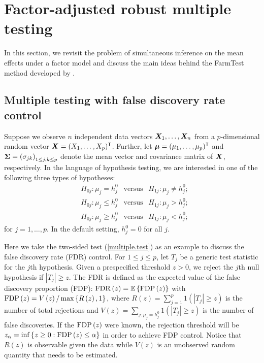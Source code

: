 \section[Factor-adjusted robust multiple testing]{Factor-adjusted robust multiple testing}\label{sec:methods}
In this section, we revisit the problem of simultaneous inference on the mean effects under a factor model and discuss the main ideas behind the FarmTest method developed by \cite{FKSZ2017}.


\subsection{Multiple testing with false discovery rate control}





Suppose we observe $n$ independent data vectors $\bm{X}_{1}, \ldots, \bm{X}_n$ from a $p$-dimensional random vector $\bm{X}= \left( X_1, \ldots, X_p \right)^\intercal$. Further, let $\bm{\mu} = \left( \mu_1, \ldots, \mu_p \right)^\intercal$ and $\bm{\Sigma} = \left(\sigma_{jk} \right)_{1\leq   j, k\leq  p}$ denote the mean vector and covariance matrix of $\bm{X}$, respectively. In the language of hypothesis testing, we are interested in one of the following three types of hypotheses:
  \begin{align}  \label{multiple.test}
	& H_{0j} :  \mu_j = h_j^0 \ \ \mbox{ versus } \ \ H_{1j}: \mu_j \neq h_j^0 ;
	\\
	\label{multiple_1}
		& H_{0j} :  \mu_j \leq h_j^0 \ \ \mbox{ versus } \ \ H_{1j}: \mu_j > h_j^0 ;
		 \\
		 \label{multiple_2}
			& H_{0j} :  \mu_j \geq h_j^0 \ \ \mbox{ versus } \ \ H_{1j}: \mu_j < h_j^0 ;
\end{align}
for $ j= 1, \ldots, p$.
In the default setting, $h_j^0 = 0$ for all $j$.

Here we take the two-sided test (\ref{multiple.test}) as an example to discuss the false discovery rate (FDR) control. For $1\leq j\leq p$, let $T_j$ be a generic test statistic for the $j$th hypothesis. Given a prespecified threshold $z>0$, we reject the $j$th null hypothesis if $|T_j| \geq  z$. The FDR is defined as the expected value of the false discovery proportion (FDP): ${\rm FDR}\left(z\right) = \mathbb{E} \left\{ {\rm FDP}\left(z\right) \right\} $ with ${\rm FDP}\left(z\right)= V\left(z\right) / \max \left\{R\left(z\right),1 \right\}$, where $R\left(z\right) = \sum_{j=1}^p 1 \left( |T_j | \geq  z \right) $ is the number of total rejections and $V\left(z\right) = \sum_{j: \mu_j = h_j^0} 1  \left( |T_j| \geq z \right) $ is the number of false discoveries. If the ${\rm FDP}\left(z\right)$ were known, the rejection threshold will be $z_\alpha = \inf \left\{ z\geq 0 :  {\rm FDP}\left(z\right) \leq  \alpha  \right\}$ in order to achieve FDP control.
Notice that $R\left(z\right)$ is observable given the data while $V\left(z\right)$ is an unobserved random quantity that needs to be estimated.

